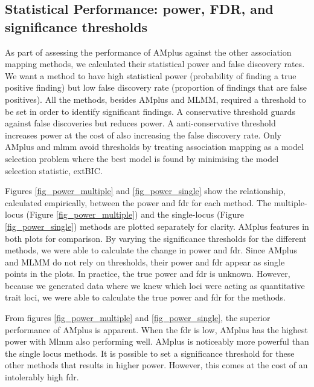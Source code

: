 \documentclass[12pt]{article}
\begin{document}
\subsection{Statistical Performance: power, FDR, and significance thresholds}

As part of assessing the performance of AMplus against the other association mapping methods, 
we calculated their statistical power and false discovery rates. 
We want a method to have high statistical power (probability of finding a true positive finding) but 
low false discovery rate (proportion of findings that are false positives). 
All the methods, besides AMplus and MLMM, required a threshold to be set in order to identify significant findings. 
A conservative threshold guards against false discoveries but reduces power. 
A anti-conservative threshold increases power at the cost of also increasing the false discovery rate. Only AMplus and mlmm avoid thresholds by treating association mapping as a model selection problem where the best model is found by minimising the model selection statistic, extBIC.

Figures \ref{fig_power_multiple}  and \ref{fig_power_single} show the relationship, calculated empirically, between the power and fdr for each method. The multiple-locus (Figure \ref{fig_power_multiple})   and the single-locus (Figure \ref{fig_power_single})  methods are plotted separately for clarity. 
AMplus features in both plots for comparison. By varying the significance thresholds for the different methods, we were able to calculate the change in power and fdr. Since AMplus and MLMM do not rely on thresholds, their power and fdr appear as single points in the plots. In practice, the true power and fdr is unknown. However, because we generated data where we knew which loci were acting as quantitative trait loci, we were able to calculate the true power and fdr for the methods.

From figures \ref{fig_power_multiple}  and \ref{fig_power_single}, the superior performance of AMplus is apparent. When the fdr is low, AMplus has the highest power with Mlmm also performing well. AMplus is noticeably more powerful than the single locus methods. 
It is possible to set a significance threshold for these other methods that results in higher power. 
However, this comes at the cost of an intolerably high fdr.
\end{document}

